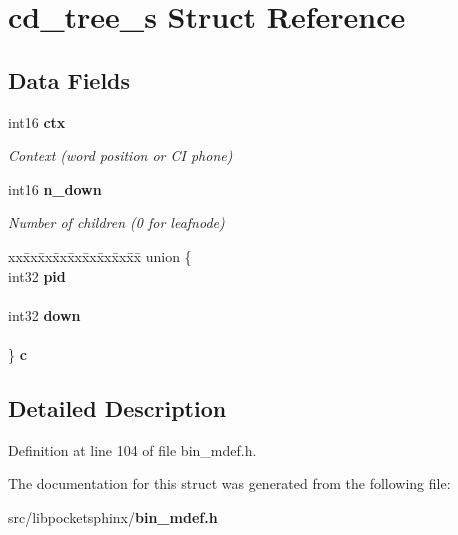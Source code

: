 \section{cd\-\_\-tree\-\_\-s Struct Reference}
\label{structcd__tree__s}
\subsection*{Data Fields}
\begin{DoxyCompactItemize}
\item 
int16 {\bf ctx}\label{structcd__tree__s_a2168538bf6cc21ad1a2c99fa2deb4559}

\begin{DoxyCompactList}\small\item\em Context (word position or C\-I phone) \end{DoxyCompactList}\item 
int16 {\bf n\-\_\-down}\label{structcd__tree__s_ae5e735d325b0f278ff2ad55293faa616}

\begin{DoxyCompactList}\small\item\em Number of children (0 for leafnode) \end{DoxyCompactList}\item 
\begin{tabbing}
xx\=xx\=xx\=xx\=xx\=xx\=xx\=xx\=xx\=\kill
union \{\\
\>int32 {\bf pid}\\
\>\\
\>int32 {\bf down}\\
\>\\
\} {\bfseries c}\label{structcd__tree__s_acc49ddc3248fc58d5a9bf241fffcbc2b}
\\

\end{tabbing}\end{DoxyCompactItemize}


\subsection{Detailed Description}


Definition at line 104 of file bin\-\_\-mdef.\-h.



The documentation for this struct was generated from the following file\-:\begin{DoxyCompactItemize}
\item 
src/libpocketsphinx/{\bf bin\-\_\-mdef.\-h}\end{DoxyCompactItemize}

